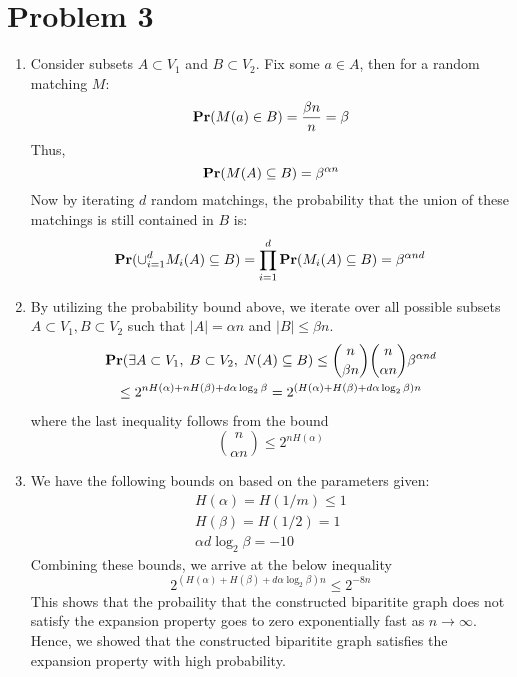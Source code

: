\documentclass[12pt]{article}%
\begin{document}
\section*{Problem 3}
\begin{enumerate}
  \item Consider subsets $A \subset V_1$ and $B \subset V_2$. Fix some $a \in A$, then for a random matching $M$:
  $${\bf Pr}(M(a) \in B) = \frac{\beta n}{n} = \beta $$ Thus,
  $$ {\bf Pr}(M(A) \subseteq B) = \beta^{\alpha n}$$ Now by iterating $d$ random matchings, the probability that the union of these matchings is still contained in $B$ is:
  $${\bf Pr}(\cup^{d}_{i=1}M_i(A) \subseteq B) = \prod_{i=1}^d {\bf Pr}(M_i(A) \subseteq B) = \beta^{\alpha n d} $$
  \item By utilizing the probability bound above, we iterate over all possible subsets $A \subset V_1, B \subset V_2$ such that $|A| = \alpha n$ and $|B| \leq \beta n$.
  \begin{gather*}
    {\bf Pr}(\exists A \subset V_1, \; B \subset V_2,  \; N(A) \subseteq B) \leq {n \choose \beta n}{n \choose \alpha n} \beta^{\alpha n d} \\
    \leq 2^{nH(\alpha) + nH(\beta) + d \alpha\log_2\beta} = 2^{(H(\alpha) + H(\beta) + d \alpha\log_2\beta)n}
  \end{gather*}
  where the last inequality follows from the bound
  $${n \choose \alpha n} \leq 2^{n H(\alpha)} $$
  \item We have the following bounds on based on the parameters given:
  \begin{gather*}
    H(\alpha) = H(1/m) \leq 1 \\
    H(\beta) = H(1/2) = 1 \\
    \alpha d \log_2 \beta = -10
  \end{gather*}
  Combining these bounds, we arrive at the below inequality
  $$2^{(H(\alpha) + H(\beta) + d \alpha\log_2\beta)n} \leq 2^{-8n} $$
  This shows that the probaility that the constructed biparitite graph does not satisfy the expansion property goes to zero exponentially fast as $n \rightarrow \infty$. Hence, we showed that  the constructed biparitite graph satisfies the expansion property with high probability.
\end{enumerate}

\newpage
\end{document}
